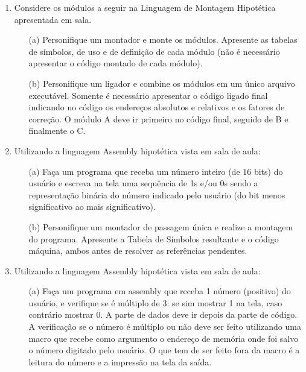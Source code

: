 \begin{enumerate}[resume]
    \item 
    Considere os módulos a seguir na Linguagem de Montagem Hipotética apresentada em sala.
    \begin{multicols}{3}
    \end{multicols}
    \begin{itemize}
        \item [(a)]
        Personifique um montador e monte os módulos. 
        Apresente as tabelas de símbolos, de uso e de definição de cada módulo
        (não é necessário apresentar o código montado de cada módulo).

        \item [(b)]
        Personifique um ligador e combine os módulos em um único arquivo executável.
        Somente é necessário apresentar o código ligado final indicando no código
        os endereços absolutos e relativos e os fatores de correção.
        O módulo A deve ir primeiro no código final, seguido de B e finalmente o C.
    \end{itemize}

    \item
    Utilizando a linguagem Assembly hipotética vista em sala de aula:
    \begin{itemize}
        \item [(a)]
        Faça um programa que receba um número inteiro (de 16 bits) do usuário
        e escreva na tela uma sequência de 1s e/ou 0s 
        sendo a representação binária do número indicado pelo usuário 
        (do bit menos significativo ao mais significativo).

        \item [(b)]
        Personifique um montador de passagem única e realize a montagem do programa.
        Apresente a Tabela de Símbolos resultante e o código máquina,
        ambos antes de resolver as referências pendentes.
    \end{itemize}
    
    \item
    Utilizando a linguagem Assembly hipotética vista em sala de aula:
    \begin{itemize}
        \item [(a)]
        Faça um programa em assembly que receba 1 número (positivo) do usuário, 
        e verifique se é múltiplo de 3:
        se sim mostrar 1 na tela, caso contrário mostrar 0. 
        A parte de dados deve ir depois da parte de código.
        A verificação se o número é múltiplo ou não 
        deve ser feito utilizando uma macro que recebe como argumento 
        o endereço de memória onde foi salvo o número digitado pelo usuário. 
        O que tem de ser feito fora da macro 
        é a leitura do número e a impressão na tela da saída.


\end{itemize}
\end{enumerate}

